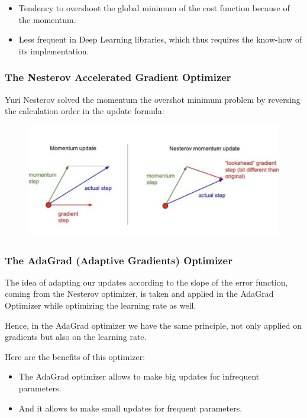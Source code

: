 \documentclass[]{book}
\begin{document}
\begin{itemize}
    \item Tendency to overshoot the global minimum of the cost function because of the momentum.
    \item Less frequent in Deep Learning libraries, which thus requires the know-how of its implementation.
\end{itemize}

\newpage

\subsubsection{The Nesterov Accelerated Gradient Optimizer}

Yuri Nesterov solved the momentum the overshot minimum problem by reversing the calculation order in the update formula:

\begin{figure}[!htbp]
        \begin{center}
            \includegraphics[scale=0.6]{ANN_33.png}
        \end{center}
\end{figure}

\subsubsection{The AdaGrad (Adaptive Gradients) Optimizer}

The idea of adapting our updates according to the slope of the error function, coming from the Nesterov optimizer, is taken and applied in the AdaGrad Optimizer while optimizing the learning rate as well.

Hence, in the AdaGrad optimizer we have the same principle, not only applied on gradients but also on the learning rate.

Here are the benefits of this optimizer:

\begin{itemize}
    \item The AdaGrad optimizer allows to make big updates for infrequent parameters.
    \item And it allows to make small updates for frequent parameters.
\end{itemize}
\end{document}
